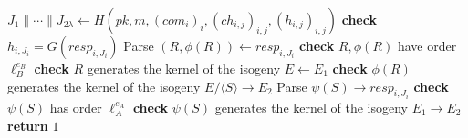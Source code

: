 \documentclass[12pt,a4paper]{article}
\begin{document}

\begin{algorithm}\label{algorithm_5}
	\caption{ $ Sign(sk,m)$ }
	\begin{algorithmic}[1]
		\State $J_1 \parallel \cdots \parallel J_{2\lambda}  \leftarrow H( pk,m,(com_i)_i , (ch_{i,j})_{i,j} , (h_{i,j})_{i,j} )$
		\State \textbf{check} $h_{i,J_i} = G(resp_{i,J_i})$
		\State Parse $(R,\phi(R)) \leftarrow resp_{i,J_i}$
		\State \textbf{check} $R , \phi(R)$ have order $\ell_B^{e_B}$
		\State \textbf{check} $R$ generates the kernel of the isogeny $E \leftarrow E_1$
		\State \textbf{check} $\phi(R)$ generates the kernel of the isogeny $E / \langle S \rangle \rightarrow E_2 $
		\ElsIf{}
		\State Parse $\psi(S) \rightarrow resp_{i,J_i}$
		\State \textbf{check} $\psi(S)$ has order $\ell_A^{e_A}$
		\State \textbf{check} $\psi(S)$ generates the kernel of the isogeny $E_1 \rightarrow E_2$
		\EndIf 
		\EndFor 
		\State \textbf{return} $1$
		\EndIf
		
	\end{algorithmic}
\end{algorithm}

\end{document}

